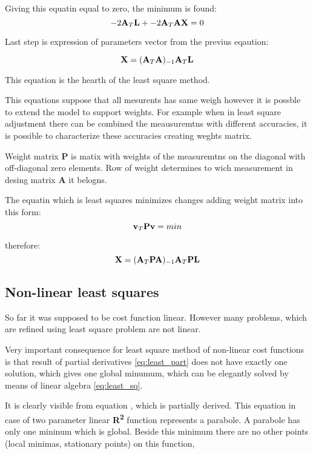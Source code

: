 \documentclass[a4paper,12pt]{report}
\newcommand{\ematr}[1]{
{\bf #1}
}
\newcommand{\evect}[1]{
{\bf #1}
}
\newcommand{\eucl}[1]{
{\bf R\textsuperscript{#1}}
}
\begin{document}
Giving this equatin equal to zero, the minimum is found:
\begin{equation}
-2\ematr{A}_{T} \evect{L} + -2\ematr{A}_{T}\ematr{A} \evect{X} = 0 
\end{equation} 

Last step is expression of parameters vector from the previus eqaution:

\begin{equation}
\evect{X} = (\ematr{A}_{T} \ematr{A})_{-1} \ematr{A}_{T} \ematr{L}
\end{equation}

This equation is the hearth of the least square method.

This equations suppose that all mesurents has same weigh however it is possble to extend the model to support weights. 
For example when in least square adjustment there can be combined the meausuremtns with different accuracies,
it is possible to characterize these accuracies creating weghts matrix.


Weight matrix \ematr{P}  is matix with weights of the measuremtns on the diagonal with off-diagonal zero elements.
Row of weight determines to wich measurement in desing matrix \ematr{A} it belogns.

The equatin which is least squares minimizes changes adding weight matrix into this form:
\begin{equation}
\evect{v}_{T}  \ematr{P} \evect{v} = min
\end{equation}

therefore:
\begin{equation}
\evect{X} = (\ematr{A}_{T} \ematr{P} \ematr{A})_{-1} \ematr{A}_{T} \ematr{P} \ematr{L}
\label{eq:least_sq}
\end{equation}


\subsection{Non-linear least squares}
\label{sec:non_least}
So far it was supposed to be cost function linear. However many problems, which  are refined using least square problem 
are not linear.

Very important consequence for least square method of non-linear cost functions is that result of partial derivatives 
\eqref{eq:least_part} does not have exactly one solution, which gives one global minumum, which can be 
elegantly solved by means of linear algebra \eqref{eq:least_sq}. 

It is clearly visible from equation \label{eq:least_be_part}, which is partially derived. This equation 
in case of two parameter linear \eucl{2} function represents a parabole. 
A parabole has only one mininum which is global. Beside this minimum there are no other points 
(local minimas, stationary points) on this function,
\end{document}
